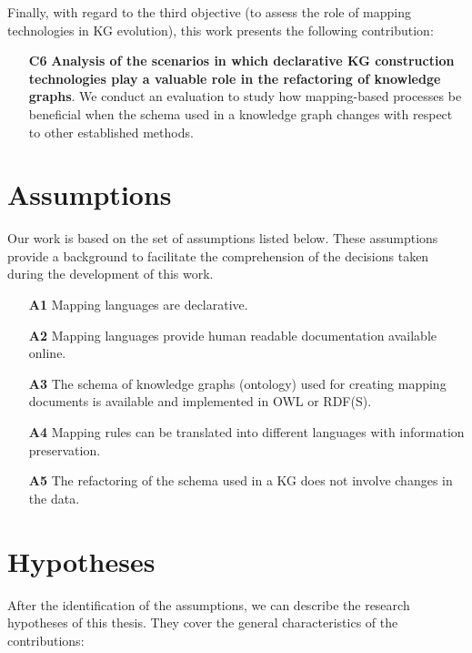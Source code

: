 Finally, with regard to the third objective (to assess the role of mapping technologies in KG evolution), this work presents the following contribution:

\begin{enumerate}
    \item[\textbf{C6}]\textbf{Analysis of the scenarios in which declarative KG construction technologies play a valuable role in the refactoring of knowledge graphs}. We conduct an evaluation to study how mapping-based processes be beneficial when the schema used in a knowledge graph changes with respect to other established methods.  %
\end{enumerate}


\section{Assumptions}
\label{sec:chp3-assumptions}
Our work is based on the set of assumptions listed below. These assumptions provide a background to facilitate the comprehension of the decisions taken during the development of this work. 


\begin{enumerate}
    \item[\textbf{A1}] Mapping languages are declarative.
    \item[\textbf{A2}] Mapping languages provide human readable documentation available online.
    \item[\textbf{A3}] The schema of knowledge graphs (ontology) used for creating mapping documents is available and implemented in OWL or RDF(S). 
    \item[\textbf{A4}] Mapping rules can be translated into different languages with information preservation. 
    \item[\textbf{A5}] The refactoring of the schema used in a KG does not involve changes in the data.
\end{enumerate}


\section{Hypotheses}
\label{sec:chp3-hypotheses}

After the identification of the assumptions, we can describe the research hypotheses  of this thesis. They cover the general characteristics of the contributions:


